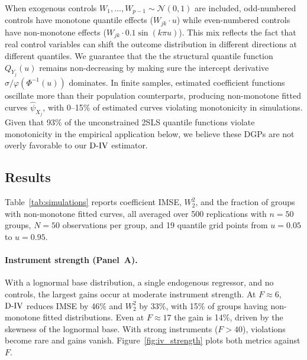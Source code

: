 \documentclass[12pt]{article}
\newcommand{\est}{\ensuremath{\textnormal{D-IV}}\xspace}
\begin{document}
When exogenous controls $W_1, \ldots, W_{p-1} \sim \mathcal{N}(0,1)$ are included, odd-numbered controls have monotone quantile effects ($W_{jk} \cdot u$) while even-numbered controls have non-monotone effects ($W_{jk} \cdot 0.1 \sin(k\pi u)$). This mix reflects the fact that real control variables can shift the outcome distribution in different directions at different quantiles. We guarantee that the the structural quantile function $Q_{Y_j}(u)$ remains non-decreasing by making sure the intercept derivative $\sigma / \varphi(\Phi^{-1}(u))$ dominates. In finite samples, estimated coefficient functions oscillate more than their population counterparts, producing non-monotone fitted curves $\hat{\psi}_{X_j}$, with 0--15\% of estimated curves violating monotonicity in simulations. Given that 93\% of the unconstrained 2SLS quantile functions violate monotonicity in the empirical application below, we believe these DGPs are not overly favorable to our \est estimator.


\subsection{Results}

Table~\ref{tab:simulations} reports coefficient IMSE, $W_2^2$, and the fraction of groups with non-monotone fitted curves, all averaged over 500 replications with $n = 50$ groups, $N = 50$ observations per group, and 19 quantile grid points from $u = 0.05$ to $u = 0.95$.



\paragraph{Instrument strength (Panel~A).} With a lognormal base distribution, a single endogenous regressor, and no controls, the largest gains occur at moderate instrument strength. At $F \approx 6$, \est reduces IMSE by 46\% and $W_2^2$ by 33\%, with 15\% of groups having non-monotone fitted distributions. Even at $F \approx 17$ the gain is 14\%, driven by the skewness of the lognormal base. With strong instruments ($F > 40$), violations become rare and gains vanish. Figure~\ref{fig:iv_strength} plots both metrics against $F$.
\end{document}
